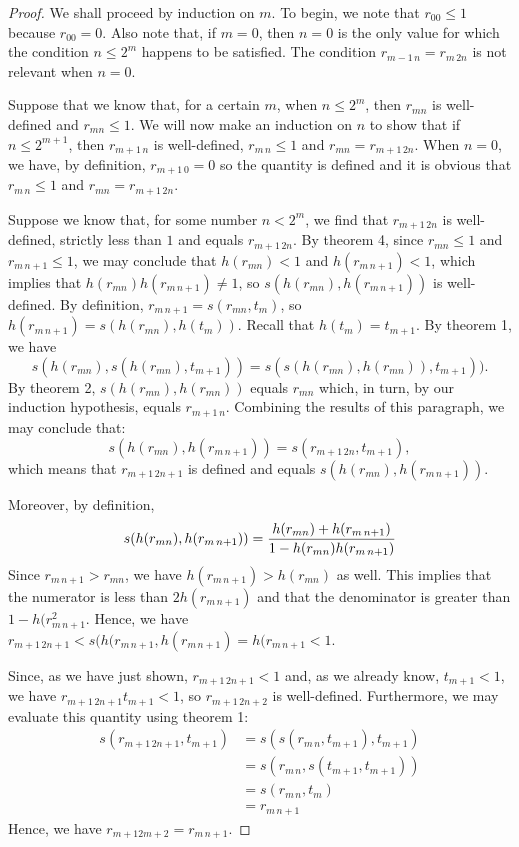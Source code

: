 \documentclass[12pt]{article}
\begin{document}
\begin{proof}
We shall proceed by induction on $m$.  To begin, we note that $r_{00} \le 1$
because $r_{00} = 0$.  Also note that, if $m=0$, then $n=0$ is the only value for
which the condition $n \le 2^m$ happens to be satisfied.  The condition 
$r_{m-1 \, n} = r_{m \, 2n}$ is not relevant when $n = 0$.

Suppose that we know that, for a certain $m$, when $n \le 2^m$, then $r_{mn}$ is 
well-defined and $r_{mn} \le 1$.  We will now make an induction on $n$ to show that
if $n \le 2^{m+1}$, then $r_{m+1 \, n}$ is well-defined, $r_{m \, n} \le 1$ and 
$r_{mn} = r_{m+1 \, 2n}$.  When $n=0$, we have, by definition, $r_{m+1 \, 0} = 0$ 
so the quantity is defined and it is obvious that $r_{m \, n} \le 1$ and 
$r_{mn} = r_{m+1 \, 2n}$.

Suppose we know that, for some number $n < 2^m$, we find that $r_{m+1 \, 2n}$ 
is well-defined, strictly less than $1$ and equals $r_{m+1 \, 2n}$.  By theorem 4,
since $r_{mn} \le 1$ and $r_{m \, n+1} \le 1$, we may conclude that $h(r_{mn}) < 1$ 
and $h(r_{m \, n+1}) < 1$, which implies that $h(r_{mn}) h(r_{m \, n+1}) \neq 1$,
so $s(h(r_{mn}), h(r_{m \, n+1}))$ is well-defined.  By definition, $r_{m \, n+1} =
s(r_{mn}, t_m)$, so $h(r_{m \, n+1}) = s(h(r_{mn}), h(t_m))$.  Recall that $h(t_m) = 
t_{m+1}$.  By theorem 1, we have
\[
s(h(r_{mn}), s(h(r_{mn}), t_{m+1})) =
s(s(h(r_{mn}), h(r_{mn})), t_{m+1})).
\]
By theorem 2, $s(h(r_{mn}), h(r_{mn}))$ equals $r_{mn}$ which, in turn, by our
induction hypothesis, equals $r_{m+1 \, n}$.  Combining the results of this
paragraph, we may conclude that:
\[
s(h(r_{mn}), h(r_{m \, n+1})) =
s(r_{m+1 \, 2n}, t_{m+1}),
\]
which means that $r_{m+1 \, 2n+1}$ is defined and equals $s(h(r_{mn}), h(r_{m \, n+1}))$.

Moreover, by definition,
\[
s(h(r_{mn}), h(r_{m \, n+1})) =
{h(r_{mn}) + h(r_{m \, n+1}) \over 1 - h(r_{mn}) h(r_{m \, n+1})}
\]
Since $r_{m \, n+1} > r_{mn}$, we have $h(r_{m \, n+1}) > h(r_{mn})$ as well.  This
implies that the numerator is less than $2 h(r_{m \, n+1})$ and that the denominator
is greater than $1 - h(r_{m \, n+1}^2$.  Hence, we have $r_{m+1 \, 2n+1} < 
s(h(r_{m \, n+1}, h(r_{m \, n+1}) = h(r_{m \, n+1} < 1$.

Since, as we have just shown, $r_{m+1 \, 2n+1} < 1$ and, as we already know,
$t_{m+1} < 1$, we have $r_{m+1 \, 2n+1} t_{m+1} < 1$, so $r_{m+1 \, 2n+2}$
is well-defined.  Furthermore, we may evaluate this quantity using theorem 1:
\begin{align*}
s(r_{m+1 \, 2n+1}, t_{m+1}) &=
s(s(r_{m \, n}, t_{m+1}), t_{m+1}) \\ &=
s(r_{m \, n}, s(t_{m+1}, t_{m+1})) \\ &=
s(r_{m \, n}, t_m) \\ &=
r_{m \, n + 1}
\end{align*}
Hence, we have $r_{m+1 2m+2} = r_{m \, n+1}$.

\end{proof}


\end{document}
